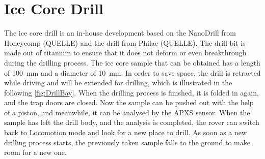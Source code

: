 \section{Ice Core Drill} \label{sec:IceCoreDrill}
The ice core drill is an in-house development based on the NanoDrill from Honeycomp (QUELLE) and the drill from Philae (QUELLE). The drill bit is made out of titanium to ensure that it does not deform or even breakthrough during the drilling process.
The ice core sample that can be obtained has a length of 100~mm and a diameter of 10~mm.
In order to save space, the drill is retracted while driving and will be extended for drilling, which is illustrated in the following \autoref{fig:DrillBay}.
When the drilling process is finished, it is folded in again, and the trap doors are closed.
Now the sample can be pushed out with the help of a piston, and meanwhile, it can be analysed by the APXS sensor. 
When the sample has left the drill body, and the analysis is completed, the rover can switch back to Locomotion mode and look for a new place to drill. As soon as a new drilling process starts, the previously taken sample falls to the ground to make room for a new one.


